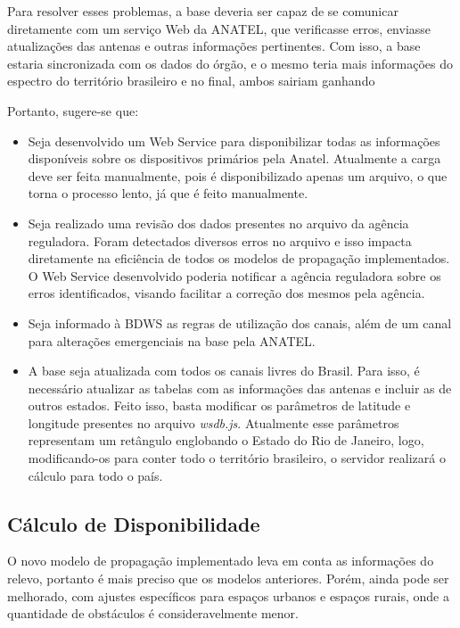 Para resolver esses problemas, a base deveria ser capaz de se comunicar diretamente com um serviço Web da ANATEL, que verificasse erros, enviasse atualizações das antenas e outras informações pertinentes. Com isso, a base estaria sincronizada com os dados do órgão, e o mesmo teria mais informações do espectro do território brasileiro e no final, ambos sairiam ganhando

Portanto, sugere-se que:

\begin{itemize}
\item Seja desenvolvido um Web Service para disponibilizar todas as informações disponíveis sobre os dispositivos primários pela Anatel. Atualmente a carga deve ser feita manualmente, pois é disponibilizado apenas um arquivo, o que torna o processo lento, já que é feito manualmente.
\item Seja realizado uma revisão dos dados presentes no arquivo da agência reguladora. Foram detectados diversos erros no arquivo e isso impacta diretamente na eficiência de todos os modelos de propagação implementados. O Web Service desenvolvido poderia notificar a agência reguladora sobre os erros identificados, visando facilitar a correção dos mesmos pela agência.
\item Seja informado à BDWS as regras de utilização dos canais, além de um canal para alterações emergenciais na base pela ANATEL.
\item A base seja atualizada com todos os canais livres do Brasil. Para isso, é necessário atualizar as tabelas com as informações das antenas e incluir as de outros estados. Feito isso, basta modificar os parâmetros de latitude e longitude presentes no arquivo \textit{wsdb.js}. Atualmente esse parâmetros representam um retângulo englobando o Estado do Rio de Janeiro, logo, modificando-os para conter todo o território brasileiro, o servidor realizará o cálculo para todo o país.
\end{itemize}


\subsection{Cálculo de Disponibilidade}

O novo modelo de propagação implementado leva em conta as informações do relevo, portanto é mais preciso que os modelos anteriores. Porém, ainda pode ser melhorado, com ajustes específicos para espaços urbanos e espaços rurais, onde a quantidade de obstáculos é consideravelmente menor.

